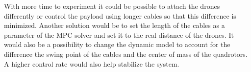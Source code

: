 With more time to experiment it could be possible to attach the drones differently or control the payload using longer cables so that this difference is minimized. Another solution would be to set the length of the cables as a parameter of the \ac{MPC} solver and set it to the real distance of the drones. It would also be a possibility to change the dynamic model to account for the difference the swing point of the cables and the center of mass of the quadrotors. A higher control rate would also help stabilize the system.


